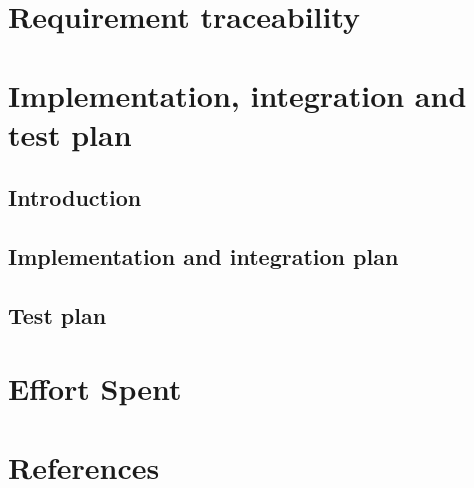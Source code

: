 \chapter{Requirement traceability}
	
\chapter{Implementation, integration and test plan}
	\section{Introduction}
		
	\section{Implementation and integration plan}
		
	\section{Test plan}
\chapter{Effort Spent}
    
\chapter{References}


